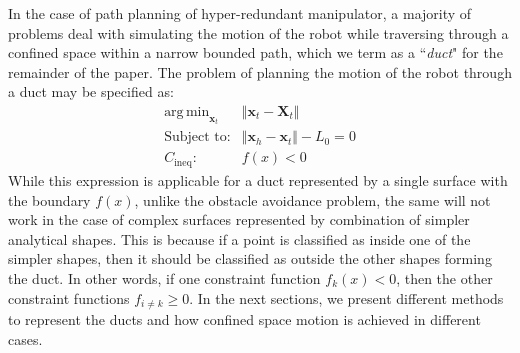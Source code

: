 \documentclass[12pt,a4]{article}
\DeclareMathOperator*{\argmin}{arg\,min}
\begin{document}
In the case of path planning of hyper-redundant manipulator, a majority of problems deal with simulating the motion of the robot while traversing through a confined space within a narrow bounded path, which we term as a ``\textit{duct}" for the remainder of the paper. The problem of planning the motion of the robot through a duct may be specified as:
\begin{align} \label{eq:path_planning_opt}
\argmin_{\textbf{x}_t} &\Vert \textbf{x}_t-\textbf{X}_t \Vert\\
\text{Subject to:} &\Vert \textbf{x}_h - \textbf{x}_t \Vert -L_0 = 0 \nonumber \\
C_{\text{ineq}}:~~&{f}(x) < 0 \nonumber
\end{align}
While this expression is applicable for a duct represented by a single surface with the boundary $f(x)$, unlike the obstacle avoidance problem, the same will not work in the case of complex surfaces represented by combination of simpler analytical shapes. This is because if a point is classified as inside one of the simpler shapes, then it should be classified as outside the other shapes forming the duct. In other words, if one constraint function $f_k(x)< 0$, then the other constraint functions $f_{i\neq k}\geq 0$. In the next sections, we present different methods to represent the ducts and how confined space motion is achieved in different cases. 
\end{document}

